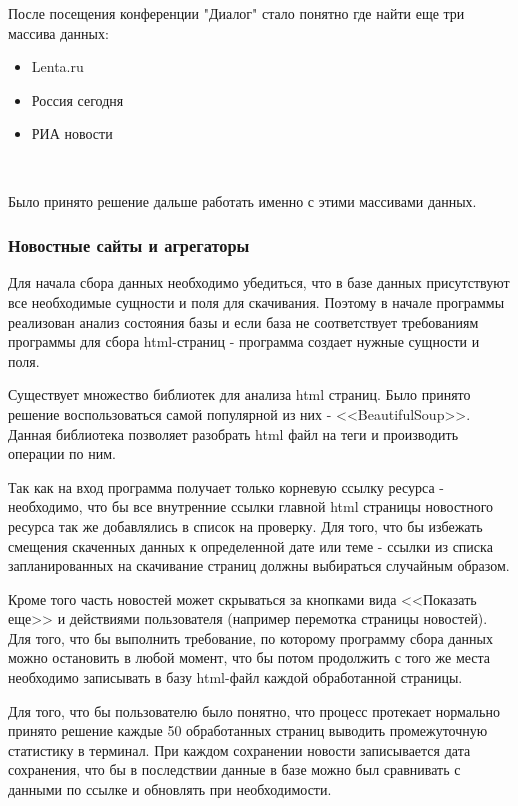 После посещения конференции "Диалог" стало понятно где найти еще три массива данных: 

\begin{itemize}
    \item Lenta.ru
    \item Россия сегодня
    \item РИА новости
\end{itemize}
~\

Было принято решение дальше работать именно с этими массивами данных.

\subsubsection{Новостные сайты и агрегаторы}

Для начала сбора данных необходимо убедиться, что в базе данных присутствуют все необходимые сущности и поля для скачивания. Поэтому в начале программы реализован анализ состояния базы и если база не соответствует требованиям программы для сбора html-страниц - программа создает нужные сущности и поля.

Существует множество библиотек для анализа html страниц. Было принято решение воспользоваться самой популярной из них - <<BeautifulSoup>>. Данная библиотека позволяет разобрать html файл на теги и производить операции по ним.

Так как на вход программа получает только корневую ссылку ресурса - необходимо, что бы все внутренние ссылки главной html страницы новостного ресурса так же добавлялись в список на проверку. Для того, что бы избежать смещения скаченных данных к определенной дате или теме - ссылки из списка запланированных на скачивание страниц должны выбираться случайным образом.

Кроме того часть новостей может скрываться за кнопками вида <<Показать еще>> и действиями пользователя (например перемотка страницы новостей). Для того, что бы выполнить требование, по которому программу сбора данных можно остановить в любой момент, что бы потом продолжить с того же места необходимо записывать в базу html-файл каждой обработанной страницы.

Для того, что бы пользователю было понятно, что процесс протекает нормально принято решение каждые 50 обработанных страниц выводить промежуточную статистику в терминал. При каждом сохранении новости записывается дата сохранения, что бы в последствии данные в базе можно был сравнивать с данными по ссылке и обновлять при необходимости.

